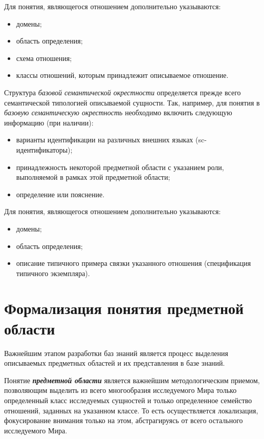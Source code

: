 Для понятия, являющегося отношением дополнительно указываются:
\begin{itemize}
	\item {домены};
	\item{область определения};
	\item{схема отношения};
	\item{классы отношений, которым принадлежит описываемое отношение}.
\end{itemize}

\begin{SCn}
\end{SCn}

Структура \textit{базовой семантической окрестности} определяется прежде всего семантической типологией описываемой сущности. Так, например, для понятия в \textit{базовую семантическую окрестность} необходимо включить следующую  информацию (при наличии):
\begin{itemize}
	\item {варианты идентификации на различных внешних языках (sc-идентификаторы)};
	\item {принадлежность некоторой предметной области с указанием роли, выполняемой в рамках этой предметной области};
	\item{определение или пояснение}.
\end{itemize}

Для понятия, являющегося отношением дополнительно указываются:
\begin{itemize}
	\item {домены};
	\item {область определения};
	\item {описание типичного примера связки указанного отношения (спецификация типичного экземпляра)}.
\end{itemize}

\section{Формализация понятия предметной области}

Важнейшим этапом разработки баз знаний является процесс выделения описываемых предметных областей и их представления в базе знаний.

Понятие \textit{\textbf{предметной области}} является важнейшим методологическим приемом, позволяющим выделить из всего многообразия исследуемого Мира только определенный класс исследуемых сущностей и только определенное семейство отношений, заданных на указанном классе. То есть осуществляется локализация,
фокусирование внимания только на этом, абстрагируясь от всего остального исследуемого Мира.

